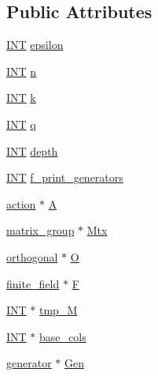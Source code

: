 \subsection*{Public Attributes}
\begin{DoxyCompactItemize}
\item 
\mbox{\hyperlink{galois_8h_a09fddde158a3a20bd2dcadb609de11dc}{I\+NT}} \mbox{\hyperlink{classpolar_ad130d95a664e916e0731e1ccf97e0ba9}{epsilon}}
\item 
\mbox{\hyperlink{galois_8h_a09fddde158a3a20bd2dcadb609de11dc}{I\+NT}} \mbox{\hyperlink{classpolar_af29b4ac62d2c71db216f2875fddf29a5}{n}}
\item 
\mbox{\hyperlink{galois_8h_a09fddde158a3a20bd2dcadb609de11dc}{I\+NT}} \mbox{\hyperlink{classpolar_a960076c858fc9eed3167ca3c8caf7eaa}{k}}
\item 
\mbox{\hyperlink{galois_8h_a09fddde158a3a20bd2dcadb609de11dc}{I\+NT}} \mbox{\hyperlink{classpolar_aca30c530eb840315f0f886f18c88fe42}{q}}
\item 
\mbox{\hyperlink{galois_8h_a09fddde158a3a20bd2dcadb609de11dc}{I\+NT}} \mbox{\hyperlink{classpolar_aba640afc6544afd704f9fd8bd4ad74f6}{depth}}
\item 
\mbox{\hyperlink{galois_8h_a09fddde158a3a20bd2dcadb609de11dc}{I\+NT}} \mbox{\hyperlink{classpolar_a5ce90304a234781178d02ef328c8d37a}{f\+\_\+print\+\_\+generators}}
\item 
\mbox{\hyperlink{classaction}{action}} $\ast$ \mbox{\hyperlink{classpolar_ae4527a218b7c5f8d48466036e765f54b}{A}}
\item 
\mbox{\hyperlink{classmatrix__group}{matrix\+\_\+group}} $\ast$ \mbox{\hyperlink{classpolar_ab8607dd4ef248b3f6082dac22b52e96e}{Mtx}}
\item 
\mbox{\hyperlink{classorthogonal}{orthogonal}} $\ast$ \mbox{\hyperlink{classpolar_a6c73f461c6d761d94c6657953e6cddf8}{O}}
\item 
\mbox{\hyperlink{classfinite__field}{finite\+\_\+field}} $\ast$ \mbox{\hyperlink{classpolar_aaa9e42afe43d749e5dd101f15c264791}{F}}
\item 
\mbox{\hyperlink{galois_8h_a09fddde158a3a20bd2dcadb609de11dc}{I\+NT}} $\ast$ \mbox{\hyperlink{classpolar_a448b162510d88e48d71557da45b48a5f}{tmp\+\_\+M}}
\item 
\mbox{\hyperlink{galois_8h_a09fddde158a3a20bd2dcadb609de11dc}{I\+NT}} $\ast$ \mbox{\hyperlink{classpolar_a4e6b171c90dffd5689d72f8a6e74a527}{base\+\_\+cols}}
\item 
\mbox{\hyperlink{classgenerator}{generator}} $\ast$ \mbox{\hyperlink{classpolar_a765ba3e8f44219738acab2c53a606315}{Gen}}

\end{DoxyCompactItemize}
